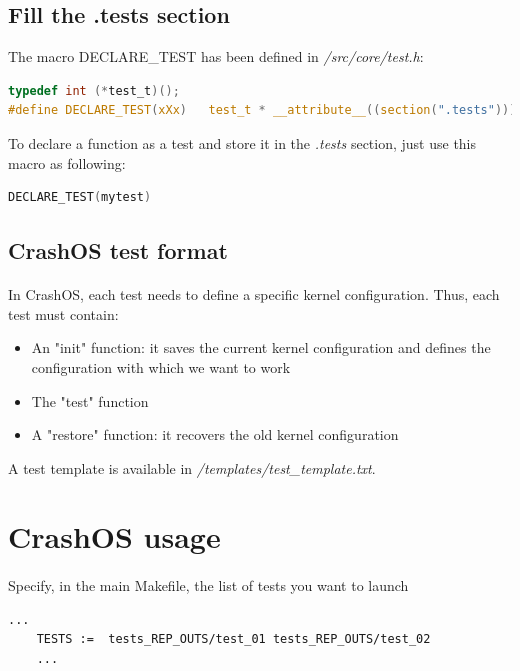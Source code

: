 \documentclass[12pt, openany]{report}
\begin{document}
\subsection*{Fill the .tests section}
The macro DECLARE\_TEST has been defined in \emph{/src/core/test.h}:
\begin{lstlisting}[language=c]
typedef int (*test_t)(); 
#define DECLARE_TEST(xXx)   test_t * __attribute__((section(".tests"))) xXx##_ptr = &xXx;
\end{lstlisting}
To declare a function as a test and store it in the \emph{.tests} section, just use this macro as following:
\begin{lstlisting}[language=c]
DECLARE_TEST(mytest)
\end{lstlisting}

\subsection*{CrashOS test format}

\paragraph{}In CrashOS, each test needs to define a specific kernel configuration. Thus, each test must contain:
\begin{itemize}
	\item An "init" function: it saves the current kernel configuration and defines the configuration with which we want to work
	\item The "test" function
	\item A "restore" function: it recovers the old kernel configuration
\end{itemize}
A test template is available in \emph{/templates/test\_template.txt}.


\section*{CrashOS usage}

\paragraph{} Specify, in the main Makefile, the list of tests you want to launch
	\begin{lstlisting}[caption=CrashOS Makefile: example of test list]
	...
	TESTS :=  tests_REP_OUTS/test_01 tests_REP_OUTS/test_02 
	...
	\end{lstlisting}
\end{document}

